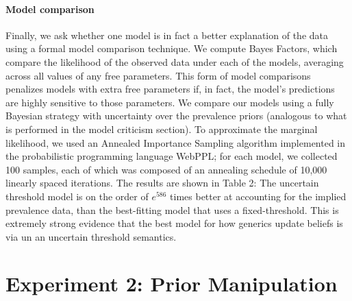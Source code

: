 \documentclass[floatsintext,doc]{apa6}
\let\oldparagraph\paragraph
\renewcommand{\paragraph}[1]{\oldparagraph{#1}\mbox{}}
\newcommand{\mht}[1]{{\textcolor{Blue}{[mht: #1]}}}
\begin{document}


\hypertarget{model-comparison}{%
\paragraph{Model comparison}\label{model-comparison}}
%
Finally, we ask whether one model is in fact a better explanation of the data using a formal model comparison technique.
We compute Bayes Factors, which compare the likelihood of the observed data under each of the models, averaging across all values of any free parameters.
This form of model comparisons penalizes models with extra free parameters if, in fact, the model's predictions are highly sensitive to those parameters.
We compare our models using a fully Bayesian strategy with uncertainty over the prevalence priors (analogous to what is performed in the model criticism section).
To approximate the marginal likelihood, we used an Annealed Importance Sampling algorithm \cite{neal2001annealed} implemented in the probabilistic programming language WebPPL; for each model, we collected 100 samples, each of which was composed of an annealing schedule of 10,000 linearly spaced iterations.
The results are shown in Table 2: The uncertain threshold model is on the order of \(e^{586}\) times better at accounting for the implied prevalence data, than the best-fitting model that uses a fixed-threshold. 
This is extremely strong evidence that the best model for how generics update beliefs is via un an uncertain threshold semantics.


\hypertarget{experiment-2-prior-manipulation}{%
\section{Experiment 2: Prior Manipulation}\label{experiment-2-prior-manipulation}}
\end{document}
